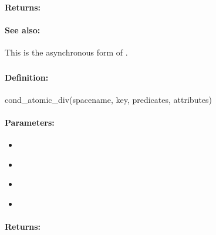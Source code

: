 \paragraph{Returns:}


\paragraph{See also:}  This is the asynchronous form of .

\pagebreak
\subsubsection{}
\label{api:ruby:cond_atomic_div}


\paragraph{Definition:}
\begin{rubycode}
cond_atomic_div(spacename, key, predicates, attributes)
\end{rubycode}

\paragraph{Parameters:}
\begin{itemize}[noitemsep]
\item {}\\

\item {}\\

\item {}\\

\item {}\\

\end{itemize}

\paragraph{Returns:}


